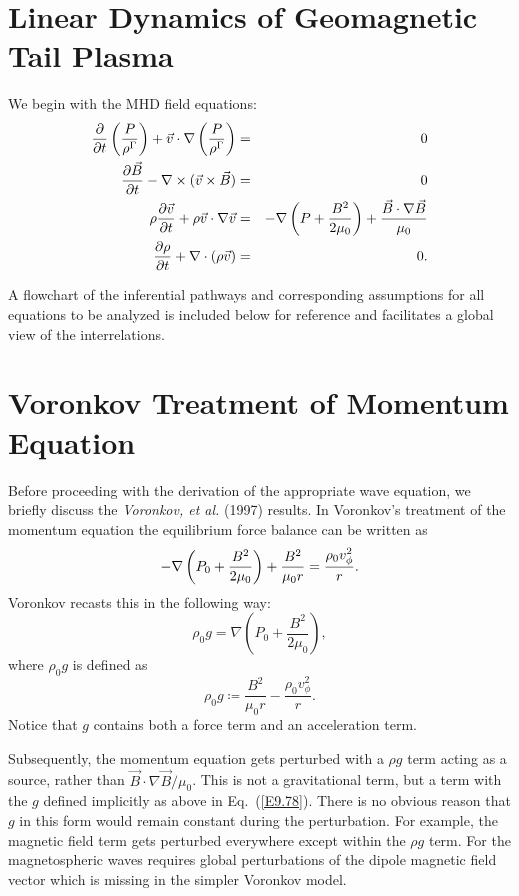\documentclass[a4paper,openany,12pt]{book}
\begin{document}
\section{Linear Dynamics of Geomagnetic Tail Plasma}

We begin with the MHD field equations:
\begin{eqnarray}
\frac{\partial}{\partial t}\left(\frac{P}{\rho^\Gamma}\right)+\vec v\cdot\nabla\left(\frac{P}{\rho^\Gamma}\right) &=& 0\label{E9.72}\\
\frac{\partial\vec B}{\partial t}-\nabla\times(\vec v\times\vec B)&=&0\label{E9.73}\\
\rho{\partial\vec v\over\partial t}+\rho\vec v\cdot\nabla\vec v&=&-\nabla\left(P+{B^2\over 2\mu_0}\right)+{\vec B\cdot\nabla\vec B\over\mu_0}\label{E9.74}\\
{\partial\rho\over\partial t}+\nabla\cdot(\rho\vec v)&=&0.
\end{eqnarray}

A flowchart of the inferential pathways and corresponding assumptions for all equations to be analyzed is included below for reference and facilitates a global view of the interrelations.

\section{Voronkov Treatment of Momentum Equation}

Before proceeding with the derivation of the appropriate wave equation, we briefly discuss the \emph{Voronkov, et al.} (1997) results. In Voronkov's treatment of the momentum equation the equilibrium force balance can be written as
\begin{equation}
-\nabla\left(P_0+{B^2\over 2\mu_0}\right)+{B^2\over\mu_0r}={\rho_0v_\phi^2\over r}.\label{E9.76}
\end{equation}
Voronkov recasts this in the following way:
\begin{equation}
\rho_0g=\nabla\left(P_0+\frac{B^2}{2\mu_0}\right),\label{E9.77}
\end{equation}
where $\rho_0 g$ is defined as
\begin{equation}
\rho_0 g\coloneqq\frac{B^2}{\mu_0r}-\frac{\rho_0v_\phi^2}{r}.\label{E9.78}
\end{equation}
Notice that $g$ contains both a force term and an acceleration term.

Subsequently, the momentum equation gets perturbed with a $\rho g$ term acting as a source, rather than 
$\vec B\cdot\nabla\vec B/\mu_0$. This is not a gravitational term, but a term with the $g$ defined implicitly as above in Eq.~(\ref{E9.78}). There is no obvious reason that $g$ in this form would remain constant during the perturbation. For example, the magnetic field term gets perturbed everywhere except within the $\rho g$ term. For the magnetospheric waves requires global perturbations of the dipole magnetic field vector which is missing in the simpler Voronkov model.
\end{document}
